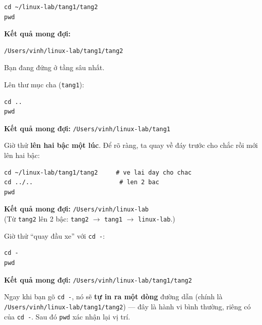 \documentclass[12pt,a4paper]{article}
\begin{document}
\begin{labbox}[title={Bước 4 --- Đi vào tận đáy bằng đường dẫn tuyệt đối}]
\begin{codebox}
\begin{verbatim}
cd ~/linux-lab/tang1/tang2
pwd
\end{verbatim}
\end{codebox}
\textbf{Kết quả mong đợi:}
\begin{codebox}
\begin{verbatim}
/Users/vinh/linux-lab/tang1/tang2
\end{verbatim}
\end{codebox}
Bạn đang đứng ở tầng sâu nhất.
\end{labbox}

\begin{labbox}[title={Bước 5 --- Đi lại bằng đường dẫn TƯƠNG ĐỐI}]
Lên thư mục cha (\texttt{tang1}):
\begin{codebox}
\begin{verbatim}
cd ..
pwd
\end{verbatim}
\end{codebox}
\textbf{Kết quả mong đợi:} \texttt{/Users/vinh/linux-lab/tang1}

Giờ thử \textbf{lên hai bậc một lúc}. Để rõ ràng, ta quay về đáy trước cho chắc rồi mới lên hai bậc:
\begin{codebox}
\begin{verbatim}
cd ~/linux-lab/tang1/tang2     # ve lai day cho chac
cd ../..                        # len 2 bac
pwd
\end{verbatim}
\end{codebox}
\textbf{Kết quả mong đợi:} \texttt{/Users/vinh/linux-lab}\\
(Từ \texttt{tang2} lên 2 bậc: \texttt{tang2} $\rightarrow$ \texttt{tang1} $\rightarrow$ \texttt{linux-lab}.)

Giờ thử ``quay đầu xe'' với \texttt{cd -}:
\begin{codebox}
\begin{verbatim}
cd -
pwd
\end{verbatim}
\end{codebox}
\textbf{Kết quả mong đợi:} \texttt{/Users/vinh/linux-lab/tang1/tang2}
\end{labbox}

\begin{notebox}
Ngay khi bạn gõ \texttt{cd -}, nó sẽ \textbf{tự in ra một dòng} đường dẫn (chính là \texttt{/Users/vinh/linux-lab/tang1/tang2}) --- đây là hành vi bình thường, riêng có của \texttt{cd -}. Sau đó \texttt{pwd} xác nhận lại vị trí.
\end{notebox}
\end{document}
